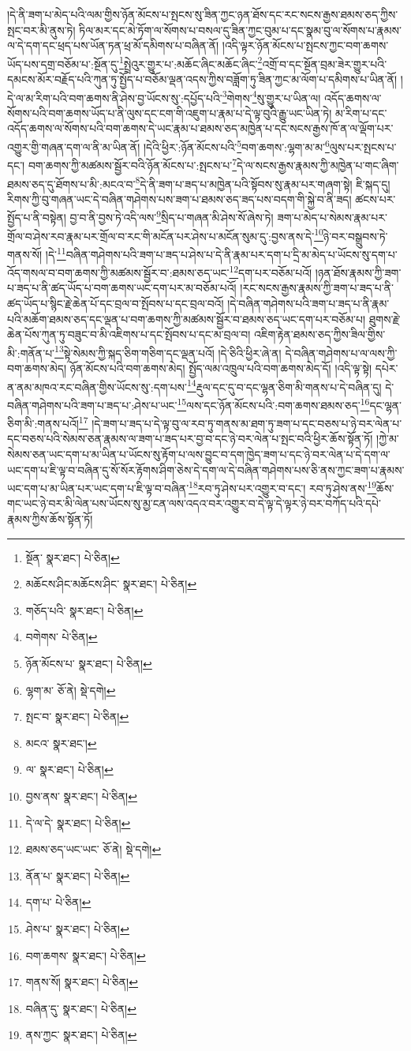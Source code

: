 །དེ་ནི་ཟག་པ་མེད་པའི་ལམ་གྱིས་ཉོན་མོངས་པ་སྤངས་སུ་ཟིན་ཀྱང་ཉན་ཐོས་དང་རང་སངས་རྒྱས་ཐམས་ཅད་ཀྱིས་སྤང་བར་མི་ནུས་ཏེ། ཏིལ་མར་དང་མེ་ཏོག་ལ་སོགས་པ་བསལ་དུ་ཟིན་ཀྱང་བུམ་པ་དང་སྣམ་བུ་ལ་སོགས་པ་རྣམས་ལ་དེ་དག་དང་ཕྲད་པས་ཡོན་ཏན་ཕྲ་མོ་དམིགས་པ་བཞིན་ནོ། །འདི་ལྟར་ཉོན་མོངས་པ་སྤངས་ཀྱང་བག་ཆགས་ཡོད་པས་དགྲ་བཅོམ་པ་:སྔོན་དུ་\footnote{སྔོན་  སྣར་ཐང་།  པེ་ཅིན། }སྤྲེའུར་གྱུར་པ་:མཆོང་ཞིང་མཆོང་ཞིང་\footnote{མཆོངས་ཤིང་མཆོངས་ཤིང་  སྣར་ཐང་།  པེ་ཅིན། }འགྲོ་བ་དང་སྔོན་བྲམ་ཟེར་གྱུར་པའི་དམངས་མོར་བརྗོད་པའི་ཀུན་ཏུ་སྤྱོད་པ་བཅོམ་ལྡན་འདས་ཀྱིས་བཟློག་ཏུ་ཟིན་ཀྱང་མ་ལོག་པ་དམིགས་པ་ཡིན་ནོ། །དེ་ལ་མ་རིག་པའི་བག་ཆགས་ནི་ཤེས་བྱ་ཡོངས་སུ་:དཔྱོད་པའི་\footnote{གཅོད་པའི་  སྣར་ཐང་།  པེ་ཅིན། }གེགས་\footnote{བགེགས་  པེ་ཅིན། }སུ་གྱུར་པ་ཡིན་ལ། འདོད་ཆགས་ལ་སོགས་པའི་བག་ཆགས་ཡོད་པ་ནི་ལུས་དང་ངག་གི་འཇུག་པ་རྣམ་པ་དེ་ལྟ་བུའི་རྒྱུ་ཡང་ཡིན་ཏེ། མ་རིག་པ་དང་འདོད་ཆགས་ལ་སོགས་པའི་བག་ཆགས་དེ་ཡང་རྣམ་པ་ཐམས་ཅད་མཁྱེན་པ་དང་སངས་རྒྱས་ཁོ་ན་ལ་ལྡོག་པར་འགྱུར་གྱི་གཞན་དག་ལ་ནི་མ་ཡིན་ནོ། །དེའི་ཕྱིར་:ཉོན་མོངས་པའི་\footnote{ཉོན་མོངས་པ་  སྣར་ཐང་།  པེ་ཅིན། }བག་ཆགས་:ལྷག་མ་མ་\footnote{ལྷག་མ་  ཅོ་ནེ།  སྡེ་དགེ། }ལུས་པར་སྤངས་པ་དང་། བག་ཆགས་ཀྱི་མཚམས་སྦྱོར་བའི་ཉོན་མོངས་པ་:སྤངས་པ་\footnote{སྤང་བ་  སྣར་ཐང་།  པེ་ཅིན། }དེ་ལ་སངས་རྒྱས་རྣམས་ཀྱི་མཁྱེན་པ་གང་ཞིག་ཐམས་ཅད་དུ་ཐོགས་པ་མི་:མངའ་བ་\footnote{མངའ་  སྣར་ཐང་། }དེ་ནི་ཟག་པ་ཟད་པ་མཁྱེན་པའི་སྟོབས་སུ་རྣམ་པར་གཞག་སྟེ། ཇི་སྐད་དུ། རིགས་ཀྱི་བུ་གཞན་ཡང་དེ་བཞིན་གཤེགས་པས་ཟག་པ་ཐམས་ཅད་ཟད་པས་བདག་གི་སྐྱེ་བ་ནི་ཟད། ཚངས་པར་སྤྱོད་པ་ནི་བསྟེན། བྱ་བ་ནི་བྱས་ཏེ་འདི་ལས་\footnote{ལ་  སྣར་ཐང་།  པེ་ཅིན། }སྲིད་པ་གཞན་མི་ཤེས་སོ་ཞེས་ཏེ། ཟག་པ་མེད་པ་སེམས་རྣམ་པར་གྲོལ་བ་ཤེས་རབ་རྣམ་པར་གྲོལ་བ་རང་གི་མངོན་པར་ཤེས་པ་མངོན་སུམ་དུ་:བྱས་ནས་དེ་\footnote{བྱས་ནས་  སྣར་ཐང་།  པེ་ཅིན། }ཉེ་བར་བསྒྲུབས་ཏེ་གནས་སོ། །དེ་\footnote{དེ་ལ་དེ་  སྣར་ཐང་།  པེ་ཅིན། }བཞིན་གཤེགས་པའི་ཟག་པ་ཟད་པ་ཤེས་པ་དེ་ནི་རྣམ་པར་དག་པ་དྲི་མ་མེད་པ་ཡོངས་སུ་དག་པ་འོད་གསལ་བ་བག་ཆགས་ཀྱི་མཚམས་སྦྱོར་བ་:ཐམས་ཅད་ཡང་\footnote{ཐམས་ཅད་ཡང་ཡང་  ཅོ་ནེ།  སྡེ་དགེ། }དག་པར་བཅོམ་པའོ། །ཉན་ཐོས་རྣམས་ཀྱི་ཟག་པ་ཟད་པ་ནི་ཚད་ཡོད་པ་བག་ཆགས་ཡང་དག་པར་མ་བཅོམ་པའོ། །རང་སངས་རྒྱས་རྣམས་ཀྱི་ཟག་པ་ཟད་པ་ནི་ཚད་ཡོད་པ་སྙིང་རྗེ་ཆེན་པོ་དང་བྲལ་བ་སྤོབས་པ་དང་བྲལ་བའོ། །དེ་བཞིན་གཤེགས་པའི་ཟག་པ་ཟད་པ་ནི་རྣམ་པའི་མཆོག་ཐམས་ཅད་དང་ལྡན་པ་བག་ཆགས་ཀྱི་མཚམས་སྦྱོར་བ་ཐམས་ཅད་ཡང་དག་པར་བཅོམ་པ། ཐུགས་རྗེ་ཆེན་པོས་ཀུན་ཏུ་བཟུང་བ་མི་འཇིགས་པ་དང་སྤོབས་པ་དང་མ་བྲལ་བ། འཇིག་རྟེན་ཐམས་ཅད་ཀྱིས་ཟིལ་གྱིས་མི་:གནོན་པ་\footnote{ནོན་པ་  སྣར་ཐང་།  པེ་ཅིན། }སྟེ་སེམས་ཀྱི་སྐད་ཅིག་གཅིག་དང་ལྡན་པའོ། །དེ་ཅིའི་ཕྱིར་ཞེ་ན། དེ་བཞིན་གཤེགས་པ་ལ་ལས་ཀྱི་བག་ཆགས་མེད། ཉོན་མོངས་པའི་བག་ཆགས་མེད། སྤྱོད་ལམ་འཁྲུལ་པའི་བག་ཆགས་མེད་དོ། །འདི་ལྟ་སྟེ། དཔེར་ན་ནམ་མཁའ་རང་བཞིན་གྱིས་ཡོངས་སུ་:དག་པས་\footnote{དག་པ་  པེ་ཅིན། }རྡུལ་དང་དུ་བ་དང་ལྷན་ཅིག་མི་གནས་པ་དེ་བཞིན་དུ། དེ་བཞིན་གཤེགས་པའི་ཟག་པ་ཟད་པ་:ཤེས་པ་ཡང་\footnote{ཤེས་པ་  སྣར་ཐང་།  པེ་ཅིན། }ལས་དང་ཉོན་མོངས་པའི་:བག་ཆགས་ཐམས་ཅད་\footnote{བག་ཆགས་  སྣར་ཐང་།  པེ་ཅིན། }དང་ལྷན་ཅིག་མི་:གནས་པའོ།\footnote{གནས་སོ།  སྣར་ཐང་།  པེ་ཅིན། } །དེ་ཟག་པ་ཟད་པ་དེ་ལྟ་བུ་ལ་རབ་ཏུ་གནས་མ་ཐག་ཏུ་ཟག་པ་དང་བཅས་པ་ཉེ་བར་ལེན་པ་དང་བཅས་པའི་སེམས་ཅན་རྣམས་ལ་ཟག་པ་ཟད་པར་བྱ་བ་དང་ཉེ་བར་ལེན་པ་སྤང་བའི་ཕྱིར་ཆོས་སྟོན་ཏོ། །ཀྱེ་མ་སེམས་ཅན་ཡང་དག་པ་མ་ཡིན་པ་ཡོངས་སུ་རྟོག་པ་ལས་བྱུང་བ་དག་ཁྱེད་ཟག་པ་དང་ཉེ་བར་ལེན་པ་དེ་དག་ལ་ཡང་དག་པ་ཇི་ལྟ་བ་བཞིན་དུ་སོ་སོར་རྟོགས་ཤིག་ཅེས་དེ་དག་ལ་དེ་བཞིན་གཤེགས་པས་ཅི་ནས་ཀྱང་ཟག་པ་རྣམས་ཡང་དག་པ་མ་ཡིན་པར་ཡང་དག་པ་ཇི་ལྟ་བ་བཞིན་\footnote{བཞིན་དུ་  སྣར་ཐང་།  པེ་ཅིན། }རབ་ཏུ་ཤེས་པར་འགྱུར་བ་དང་། རབ་ཏུ་ཤེས་ནས་\footnote{ནས་ཀྱང་  སྣར་ཐང་།  པེ་ཅིན། }ཆོས་གང་ཡང་ཉེ་བར་མི་ལེན་པས་ཡོངས་སུ་མྱ་ངན་ལས་འདའ་བར་འགྱུར་བ་དེ་ལྟ་དེ་ལྟར་ཉེ་བར་བཀོད་པའི་དཔེ་རྣམས་ཀྱིས་ཆོས་སྟོན་ཏོ། 